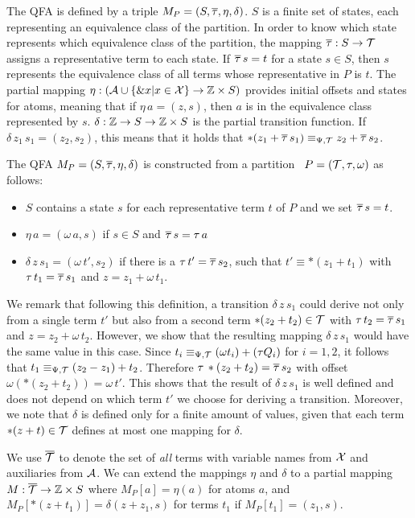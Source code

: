The QFA is defined by a triple $M_P = (S, \overline{\tau}, \eta, \delta)$. $S$ is a finite set of states, each representing an equivalence class of the partition.
In order to know which state represents which equivalence class of the partition, the mapping $\overline{\tau} : S \rightarrow \mathcal{T}$ assigns a representative term to each state.
If $\overline{\tau}\,s = t$ for a state $s \in S$, then $s$ represents the equivalence class of all terms whose representative in $P$ is $t$.
The partial mapping $\eta : (\mathcal{A} \cup \{\&x | x \in \mathcal{X}\} \rightarrow \mathbb{Z} \times S)$ provides initial offsets and states for atoms, meaning that if $\eta\,a = (z,s)$, then $a$ is in the equivalence class represented by $s$.
$\delta : \mathbb{Z} \rightarrow S \rightarrow \mathbb{Z} \times S$ is the partial transition function.
If $\delta\,z_1\,s_1 = (z_2, s_2)$, this means that it holds that $*(z_1 + \overline{\tau}\,s_1) \equiv_{\Psi,\mathcal{T}} z_2 + \overline{\tau}\,s_2$.

The QFA $M_P = (S, \overline{\tau}, \eta, \delta)$ is constructed from a partition  $P = (\mathcal{T}, \tau, \omega)$ as follows:
\begin{itemize}
  \item $S$ contains a state $s$ for each representative term $t$ of $P$ and we set $\overline{\tau}\,s = t$.
  \item $\eta\,a = (\omega\,a, s)$ if $s \in S$ and $\overline{\tau}\,s = \tau\,a$
  \item $\delta\,z\,s_1 = (\omega\,t', s_2)$ if there is a $\tau\,t'=\overline{\tau}\,s_2$, such that $t' \equiv *(z_1 + t_1)$ with $\tau \,t_1= \overline{\tau}\,s_1$ and $z = z_1 + \omega\,t_1$.
\end{itemize}

We remark that following this definition, a transition $\delta\,z\,s_1$ could derive not only from a single term $t'$ but also from a second term $*(z_2 + t_2) \in \mathcal{T}$ with $\tau\,t_2=\overline{\tau}\,s_1$ and $z = z_2 + \omega\,t_2$.
However, we show that the resulting mapping $\delta\,z\,s_1$  would have the same value in this case.
Since $t_i \equiv_{\Psi,\mathcal{T}} (\omega t_i) + (\tau Q_i)$ for $i = 1,2$, it follows that $t_1 \equiv_{\Psi,\mathcal{T}} (z_2 - z_1)+ t_2$.
Therefore $\tau\,*(z_2+t_2)=\overline{\tau}\,s_2$ with offset $\omega(*(z_2+t_2)) = \omega\,t'$.
This shows that the result of $\delta\,z\,s_1$ is well defined and does not depend on which term $t'$ we choose for deriving a transition.
Moreover, we note that $\delta$ is defined only for a finite amount of values, given that each term $*(z + t) \in \mathcal{T}$ defines at most one mapping for $\delta$.

We use ${\overline{\mathcal{T}}}$ to denote the set of \emph{all} terms with variable names from $\mathcal{X}$ and auxiliaries from $\mathcal{A}$.
We can extend the mappings $\eta$ and $\delta$ to a partial mapping $M : {\overline{\mathcal{T}}} \rightarrow \mathbb{Z} \times S$ where $M_P[a] = \eta(a)$ for atoms $a$, and $M_P[*(z+t_1)] = \delta(z+z_1, s)$ for terms $t_1$ if $M_P[t_1] = (z_1,s)$.

